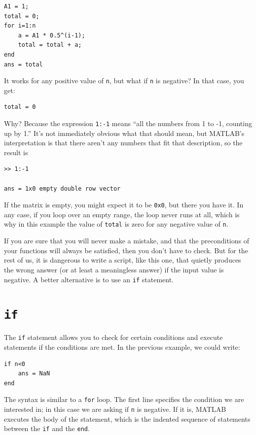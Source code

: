 \documentclass{book}
\begin{document}
\begin{verbatim}
A1 = 1;
total = 0;
for i=1:n
    a = A1 * 0.5^(i-1);
    total = total + a;
end
ans = total
\end{verbatim}

It works for any positive value of {\tt n}, but what if {\tt n}
is negative?  In that case, you get:

\begin{verbatim}
total = 0
\end{verbatim}

Why?  Because the expression {\tt 1:-1} means ``all the numbers
from 1 to -1, counting up by 1.''  It's not immediately obvious
what that should mean, but MATLAB's interpretation is that there
aren't any numbers that fit that description, so the result is

\begin{verbatim}
>> 1:-1

ans = 1x0 empty double row vector
\end{verbatim}

If the matrix is empty, you might expect it to be {\tt 0x0}, but
there you have it.  In any case, if you loop over an empty range,
the loop never runs at all, which is why in this example the
value of {\tt total} is zero for any negative value of {\tt n}.

If you are sure that you will never make a mistake, and that the
preconditions of your functions will always be satisfied, then you
don't have to check.  But for the rest of us, it is dangerous to write
a script, like this one, that quietly produces the wrong answer (or
at least a meaningless answer) if the input value is negative.
A better alternative is to use an {\tt if} statement.


\section{{\tt if}}

The {\tt if} statement allows you to check for certain conditions
and execute statements if the conditions are met.  In the previous
example, we could write:

\begin{verbatim}
if n<0
    ans = NaN
end
\end{verbatim}

The syntax is similar to a {\tt for} loop.  The first line
specifies the condition we are interested in; in this case we
are asking if {\tt n} is negative.  If it is, MATLAB executes
the body of the statement, which is the indented sequence of
statements between the {\tt if} and the {\tt end}.
\end{document}
